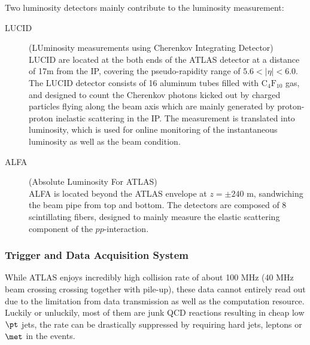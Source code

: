 Two luminosity detectors mainly contribute to the luminosity measurement:
\begin{description}

\item[LUCID] (LUminosity measurements using Cherenkov Integrating Detector) \\
LUCID are located at the both ends of the ATLAS detector at a distance of 17m from the IP, covering the pseudo-rapidity range of $5.6<|\eta|<6.0$.
The LUCID detector consists of 16 aluminum tubes filled with $\mathrm{C}_4 \mathrm{F}_{10}$ gas, 
and designed to count the Cherenkov photons kicked out by charged particles flying along the beam axis which are mainly generated by proton-proton inelastic scattering in the IP.
The measurement is translated into luminosity, which is used for online monitoring of the instantaneous luminosity as well as the beam condition. 



\item[ALFA] (Absolute Luminosity For ATLAS) \\
ALFA is located beyond the ATLAS envelope at $z=\pm 240$ m, sandwiching the beam pipe from top and bottom.
The detectors are composed of 8 scintillating fibers, designed to mainly measure the elastic scattering component of the $pp$-interaction.

\end{description}



\subsubsection{Trigger and Data Acquisition System}\label{sed::Detector::TDAQ}
While ATLAS enjoys incredibly high collision rate of about 100 MHz (40 MHz beam crossing crossing together with pile-up),
these data cannot entirely read out due to the limitation from data transmission as well as the computation resource.
Luckily or unluckily, most of them are junk QCD reactions resulting in cheap low $\pt$ jets, 
the rate can be drastically suppressed by requiring hard jets, leptons or $\met$ in the events. \\

